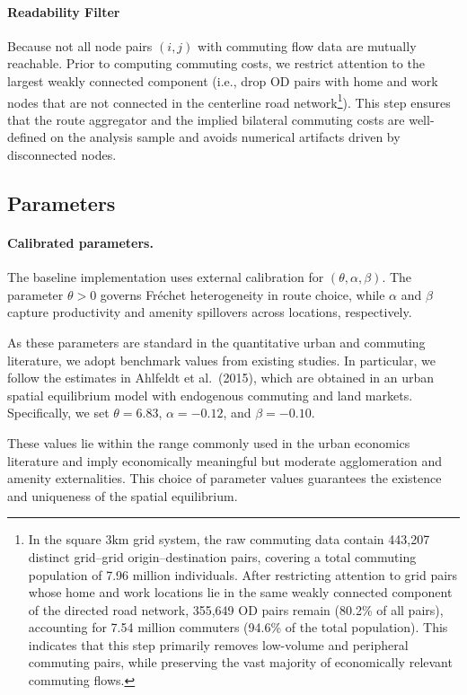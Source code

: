 \documentclass[12pt]{article}
\begin{document}
	\paragraph{Readability Filter} Because not all node pairs $(i,j)$ with commuting flow data are mutually reachable. Prior to computing commuting costs, we restrict attention to the largest weakly connected component (i.e., drop OD pairs with home and work nodes that are not connected in the centerline road network\footnote{ In the square 3km grid system, the raw commuting data contain 443,207 distinct grid--grid origin--destination pairs, covering a total commuting population of 7.96 million individuals. After restricting attention to grid pairs whose home and work locations lie in the same weakly connected component of the directed road network, 355,649 OD pairs remain (80.2\% of all pairs), accounting for 7.54 million commuters (94.6\% of the total population). This indicates that this step primarily removes low-volume and peripheral commuting pairs, while preserving the vast majority of economically relevant commuting flows. }). This step ensures that the route aggregator and the implied bilateral commuting costs are well-defined on the analysis sample and avoids numerical artifacts driven by disconnected nodes.

	\subsection{Parameters}
	
	\paragraph{Calibrated parameters.}
	The baseline implementation uses external calibration for $(\theta,\alpha,\beta)$.
	The parameter $\theta>0$ governs Fr\'echet heterogeneity in route choice, while
	$\alpha$ and $\beta$ capture productivity and amenity spillovers across locations,
	respectively.

	As these parameters are standard in the quantitative urban and commuting literature, we adopt benchmark values from existing studies. In particular, we follow the estimates in Ahlfeldt et al.\ (2015), which are obtained in an urban spatial equilibrium model with endogenous commuting and land markets.
	Specifically, we set $\theta = 6.83$, $\alpha = -0.12$, and $\beta = -0.10$.

	These values lie within the range commonly used in the urban economics literature and imply economically meaningful but moderate agglomeration and amenity externalities. This choice of parameter values guarantees the existence and uniqueness of the spatial equilibrium.
\end{document}
